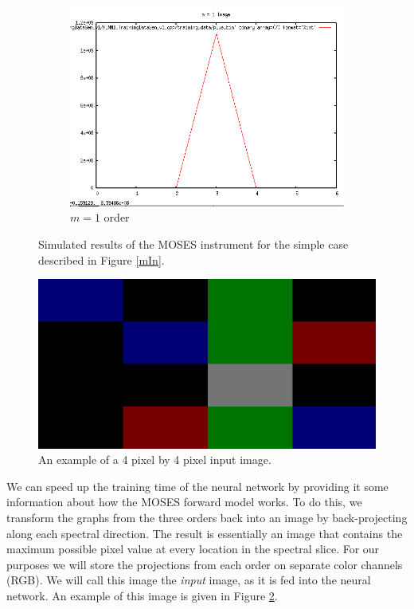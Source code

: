 \documentclass[twoside]{article}
\begin{document}
\begin{multicols}{2}
\begin{figure}
\begin{subfigure}[b]{0.3\textwidth}
            \includegraphics[width=\textwidth]{images/m1}
            \caption{$m = 1$ order }
        \end{subfigure}
 
     \caption{Simulated results of the MOSES instrument for the simple case described in Figure \ref{mIn}.}
     \label{m1-1}
 \end{figure}

\begin{figure}[H]   
	\centering
	\includegraphics[width=0.75\linewidth]{images/mOut}
	\caption{An example of a 4 pixel by 4 pixel input image.}
	\label{mOut}
\end{figure}

We can speed up the training time of the neural network by providing it some information about how the MOSES forward model works. To do this, we transform the graphs from the three orders back into an image by back-projecting along each spectral direction. The result is essentially an image that contains the maximum possible pixel value at every location in the spectral slice. For our purposes we will store the projections from each order on separate color channels (RGB). We will call this image the \textit{input} image, as it is fed into the neural network. An example of this image is given in Figure \ref{mOut}.

\end{multicols}
\end{document}
